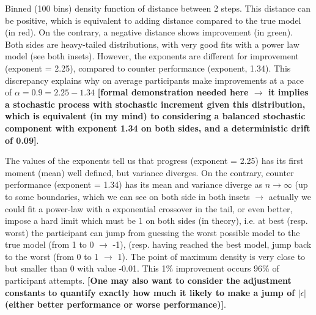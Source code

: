 \documentclass{article}
\begin{document}
Binned (100 bins) density function of distance between 2 steps. This distance can be positive, which is equivalent to adding distance compared to the true model (in red). On the contrary, a negative distance shows improvement (in green). Both sides are heavy-tailed distributions, with very good fits with a power law model (see both insets). However, the exponents are different for improvement (exponent = 2.25), compared to counter performance (exponent, 1.34). This discrepancy explains why on average participants make improvements at a pace of $\alpha = 0.9 = 2.25 - 1.34$ {\bf [formal demonstration needed here $\rightarrow$ it implies a stochastic process with stochastic increment given this distribution, which is equivalent (in my mind) to considering a balanced stochastic component with exponent 1.34 on both sides, and a deterministic drift of 0.09]}. 

The values of the exponents tell us that progress (exponent = 2.25) has its first moment (mean) well defined, but variance diverges. On the contrary, counter performance (exponent = 1.34) has its mean and variance diverge as $n \rightarrow \infty$ (up to some boundaries, which we can see on both side in both insets $\rightarrow$ actually we could fit a power-law with a exponential crossover in the tail, or even better, impose a hard limit which must be 1 on both sides (in theory), i.e. at best (resp. worst) the participant can jump from guessing the worst possible model to the true model (from 1 to 0 $\rightarrow$ -1), (resp. having reached the best model, jump back to the worst (from 0 to 1 $\rightarrow$ 1). The point of maximum density is very close to but smaller than 0 with value -0.01. This 1\% improvement occurs 96\% of participant attempts. {\bf [One may also want to consider the adjustment constants to quantify exactly how much it likely to make a jump of $|\epsilon|$ (either better performance or worse performance)]}.
\end{document}
